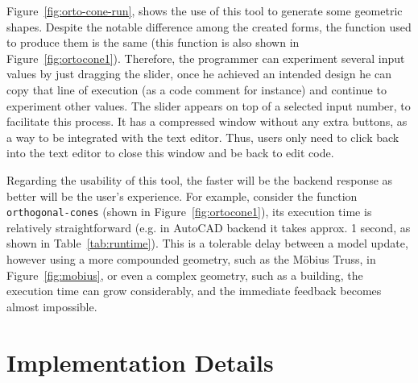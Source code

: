 Figure~\ref{fig:orto-cone-run}, shows the use of this tool to generate some geometric shapes. Despite the notable difference among the created forms, the function used to produce them is the same (this function is also shown in Figure~\ref{fig:ortocone1}). Therefore, the programmer can experiment several input values by just dragging the slider, once he achieved an intended design he can copy that line of execution (as a code comment for instance) and continue to experiment other values. The slider appears on top of a selected input number, to facilitate this process. It has a compressed window without any extra buttons, as a way to be integrated with the text editor. Thus, users only need to click back into the text editor to close this window and be back to edit code.

Regarding the usability of this tool, the faster will be the backend response as better will be the user's experience. For example, consider the function \texttt{orthogonal-cones} (shown in Figure~\ref{fig:ortocone1}), its execution time is relatively straightforward (e.g. in AutoCAD backend it takes approx. 1  second, as shown in Table~\ref{tab:runtime}). This is a tolerable delay between a model update, however using a more compounded geometry, such as the Möbius Truss, in Figure~\ref{fig:mobius}, or even a complex geometry, such as a building, the execution time can grow considerably, and the immediate feedback becomes almost impossible. 



\section{Implementation Details}

